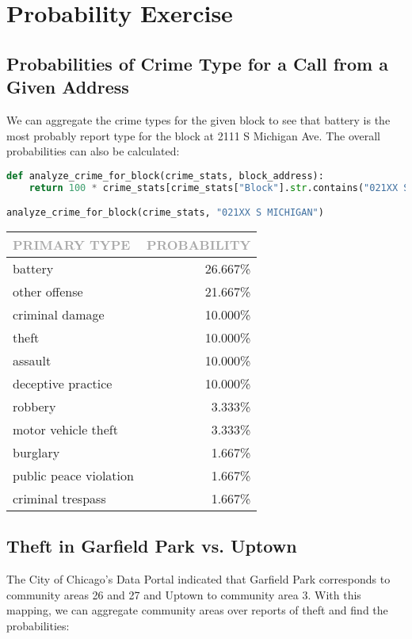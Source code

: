 \documentclass[11pt]{article}
\newcommand{\printsubsection}[1]{\normalfont\headerfontlt\textcolor{darkgray}{{#1}}}
\newcommand{\opns}[1]{\textrm{\small\printsubsection{\MakeUppercase{#1}}}}
\begin{document}
\section{Probability Exercise}
\subsection{Probabilities of Crime Type for a Call from a Given Address}
We can aggregate the crime types for the given block to see that battery is the most probably report type for the block at 2111 S Michigan Ave. The overall probabilities can also be calculated: 

\begin{lstlisting}[language=Python, numbers=none]
def analyze_crime_for_block(crime_stats, block_address):
    return 100 * crime_stats[crime_stats["Block"].str.contains("021XX S MICHIGAN")]["Primary Type"].value_counts(normalize=True)

analyze_crime_for_block(crime_stats, "021XX S MICHIGAN")
\end{lstlisting}
\begin{table}[H]
\centering \renewcommand{\arraystretch}{1.2}
\begin{tabular}{l|r}
\opns{Primary Type} &  \opns{Probability} \\\hline
battery                &     26.667\% \\
other offense          &     21.667\% \\
criminal damage        &     10.000\% \\
theft                  &     10.000\% \\
assault                &     10.000\% \\
deceptive practice     &     10.000\% \\
robbery                &      3.333\% \\
motor vehicle theft    &      3.333\% \\
burglary               &      1.667\% \\
public peace violation &      1.667\% \\
criminal trespass      &      1.667\% \\
\end{tabular}
\end{table}

\subsection{Theft in Garfield Park vs. Uptown}
The City of Chicago's Data Portal indicated that Garfield Park corresponds to community areas 26 and 27 and Uptown to community area 3. With this mapping, we can aggregate community areas over reports of theft and find the probabilities:
\end{document}
